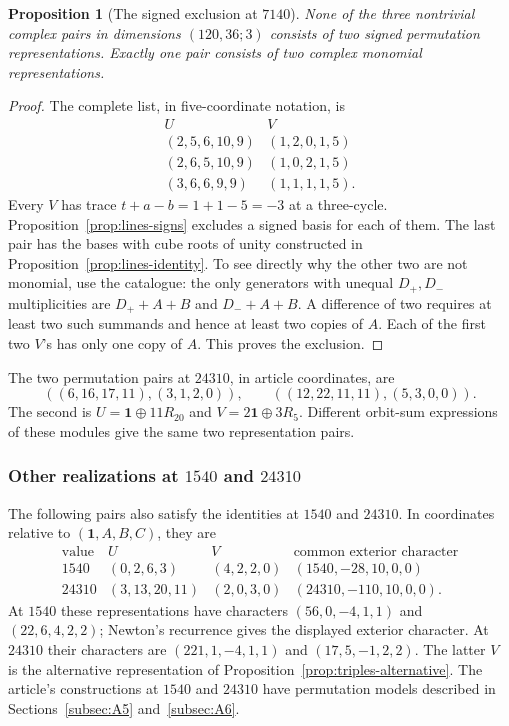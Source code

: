 \documentclass[11pt,a4paper]{article}
\newtheorem{proposition}{Proposition}[section]
\begin{document}
\begin{proposition}[The signed exclusion at $7140$]\label{p:7140all}
None of the three nontrivial complex pairs in dimensions $(120,36;3)$ consists of two signed permutation representations. Exactly one pair consists of two complex monomial representations.
\end{proposition}
\begin{proof}
The complete list, in five-coordinate notation, is
\[
\begin{array}{c|c}
U&V\\\hline
(2,5,6,10,9)&(1,2,0,1,5)\\
(2,6,5,10,9)&(1,0,2,1,5)\\
(3,6,6,9,9)&(1,1,1,1,5).
\end{array}
\]
Every $V$ has trace $t+a-b=1+1-5=-3$ at a three-cycle. Proposition~\ref{prop:lines-signs} excludes a signed basis for each of them. The last pair has the bases with cube roots of unity constructed in Proposition~\ref{prop:lines-identity}. To see directly why the other two are not monomial, use the catalogue: the only generators with unequal $D_+,D_-$ multiplicities are $D_++A+B$ and $D_-+A+B$. A difference of two requires at least two such summands and hence at least two copies of $A$. Each of the first two $V$'s has only one copy of $A$. This proves the exclusion.
\end{proof}

The two permutation pairs at $24310$, in article coordinates, are
\[
((6,16,17,11),(3,1,2,0)),\qquad
((12,22,11,11),(5,3,0,0)).
\]
The second is $U=\mathbf1\oplus11R_{20}$ and $V=2\mathbf1\oplus3R_5$. Different orbit-sum expressions of these modules give the same two representation pairs.

\subsubsection*{Other realizations at $1540$ and $24310$}
The following pairs also satisfy the identities at $1540$ and $24310$. In coordinates relative to $(\mathbf1,A,B,C)$, they are
\[
\begin{array}{r|c|c|c}
\text{value}&U&V&\text{common exterior character}\\\hline
1540&(0,2,6,3)&(4,2,2,0)&(1540,-28,10,0,0)\\
24310&(3,13,20,11)&(2,0,3,0)&(24310,-110,10,0,0).
\end{array}
\]
At $1540$ these representations have characters $(56,0,-4,1,1)$ and
$(22,6,4,2,2)$; Newton's recurrence gives the displayed exterior character.
At $24310$ their characters are $(221,1,-4,1,1)$ and $(17,5,-1,2,2)$.
The latter $V$ is the alternative representation of Proposition~\ref{prop:triples-alternative}.
The article's constructions at $1540$ and $24310$ have permutation models described
in Sections~\ref{subsec:A5} and~\ref{subsec:A6}.
\end{document}
